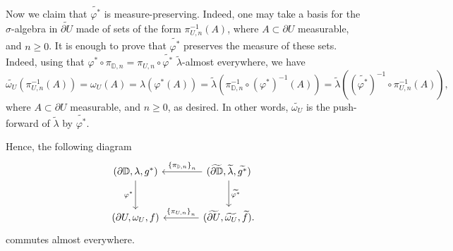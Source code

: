 \documentclass[11pt]{article}
\theoremstyle{definition}
\theoremstyle{remark}
\theoremstyle{plain}
\begin{document}
Now we claim that $ \widetilde{\varphi^*} $ is measure-preserving. Indeed, one may take a basis for the $ \sigma $-algebra in $ \widetilde{\partial U} $ made of sets of the form $ \pi^{-1}_{U,n} (A) $, where $ A\subset \partial U $ measurable, and $ n\geq 0 $.  It is enough to prove that $ 	\widetilde{\varphi^*} $ preserves the measure of these sets. Indeed, using that  $ \varphi^*\circ \pi_{\mathbb{D}, n}=  \pi_{{U}, n}\circ\widetilde{\varphi^*} $ $ \widetilde{\lambda} $-almost everywhere, we have
\[\widetilde{\omega_U}(\pi^{-1}_{U,n} (A))=\omega_U (A)=\lambda (\varphi^*(A))=\widetilde{\lambda}(\pi^{-1}_{\mathbb{D},n}\circ (\varphi^*)^{-1}(A))= \widetilde{\lambda}( (\widetilde{\varphi^*})^{-1}\circ\pi^{-1}_{U,n}(A)),\]where $ A\subset \partial U $ measurable, and $ n\geq 0 $, as desired. 
In other words, $ \widetilde{\omega_U} $ is the push-forward of $ \widetilde{\lambda} $ by $ \widetilde{\varphi^*} $.


Hence,  the following diagram
\[\begin{tikzcd}[column sep = large, row sep = large]
	(\partial\mathbb{D}, \lambda, g^*)  \arrow[swap]{d}{\varphi^*}& (\widetilde{\partial\mathbb{D}}, \widetilde{\lambda}, \widetilde{g^*})\arrow{d}{\widetilde{\varphi^*}} \arrow[swap]{l}{\left\lbrace \pi_{\mathbb{D},n}\right\rbrace _n} \\	
	(\partial U, \omega_U, f) & (\widetilde{\partial U},  \widetilde{\omega_U}, \widetilde{f})\arrow[swap]{l}{\left\lbrace \pi_{U,n}\right\rbrace _n} .
\end{tikzcd}
\] commutes almost everywhere. 


 
\end{document}
